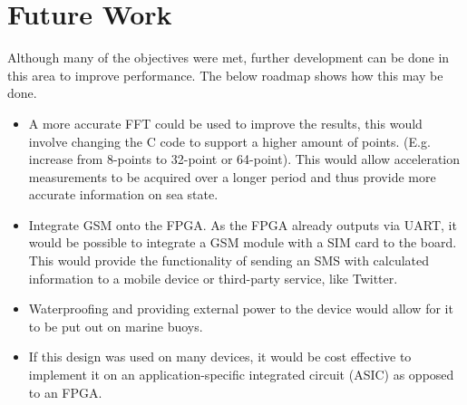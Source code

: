 \documentclass[12pt,a4paper]{report} %
\begin{document}
\section{Future Work}
Although many of the objectives were met, further development can be done in this area to improve performance. The below roadmap shows how this may be done.
\begin{itemize}
\item A more accurate FFT could be used to improve the results, this would involve changing the C code to support a higher amount of points.
(E.g. increase from 8-points to 32-point or 64-point).
This would allow acceleration measurements to be acquired over a longer period and thus provide more accurate information on sea state.
\item Integrate GSM onto the FPGA.
As the FPGA already outputs via UART, it would be possible to integrate a GSM module with a SIM card to the board.
This would provide the functionality of sending an SMS with calculated information to a mobile device or third-party service, like Twitter.
\item Waterproofing and providing external power to the device would allow for it to be put out on marine buoys.
\item If this design was used on many devices, it would be cost effective to implement it on an application-specific integrated circuit (ASIC) as opposed to an FPGA.
\end{itemize}

\end{document}
